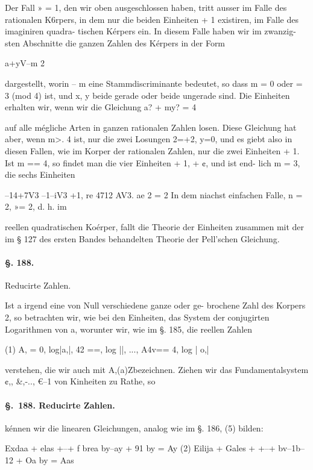 \documentclass[12pt,a4paper]{article}
\theoremstyle{plain}
\theoremstyle{definition}
\begin{document}
Der Fall » = 1, den wir oben ausgeschlossen haben, tritt ausser im Falle des rationalen K6rpers, in dem nur die beiden Einheiten + 1 existiren, im Falle des imaginiren quadra- tischen Kérpers ein. In diesem Falle haben wir im zwanzig- sten Abschnitte die ganzen Zahlen des Kérpers in der Form

a+yV--m 2

dargestellt, worin -- m eine Stammdiscriminante bedeutet, so dass m = 0 oder = 3 (mod 4) ist, und x, y beide gerade oder beide ungerade sind. Die Einheiten erhalten wir, wenn wir die Gleichung a? + my? = 4

auf alle mégliche Arten in ganzen rationalen Zahlen losen. Diese Gleichung hat aber, wenn m>. 4 ist, nur die zwei Losungen 2=+2, y=0, und es giebt also in diesen Fallen, wie im Korper der rationalen Zahlen, nur die zwei Einheiten + 1. Ist m == 4, so findet man die vier Einheiten + 1, + ¢, und ist end- lich m = 3, die sechs Einheiten

--14+7V3 --1--iV3 +1, re 4712 AV3. ae 2 = 2 In dem niachst einfachen Falle, n = 2, »= 2, d. h. im

reellen quadratischen Koérper, fallt die Theorie der Einheiten zusammen mit der im § 127 des ersten Bandes behandelten Theorie der Pell'schen Gleichung.

\paragraph{§. 188.}

Reducirte Zahlen.

Ist a irgend eine von Null verschiedene ganze oder ge- brochene Zahl des Korpers 2, so betrachten wir, wie bei den Einheiten, das System der conjugirten Logarithmen von a, worunter wir, wie im §. 185, die reellen Zahlen

(1) A, = 0, log|a,|, 42 ==, log ||, ..., A4v== 4, log | o,|

verstehen, die wir auch mit A,(a)Zbezeichnen. Ziehen wir das Fundamentalsystem ¢,, \&,-.., €--1 von Kinheiten zu Rathe, so

\paragraph{\S.~188. Reducirte Zahlen.}


kénnen wir die linearen Gleichungen, analog wie im §. 186, (5) bilden:

Exdaa + elas +--+ f brea by--ay + 91 by = Ay (2) Eilija + Gales + +--+ bv--1b--12 + Oa by = Aas
\end{document}
